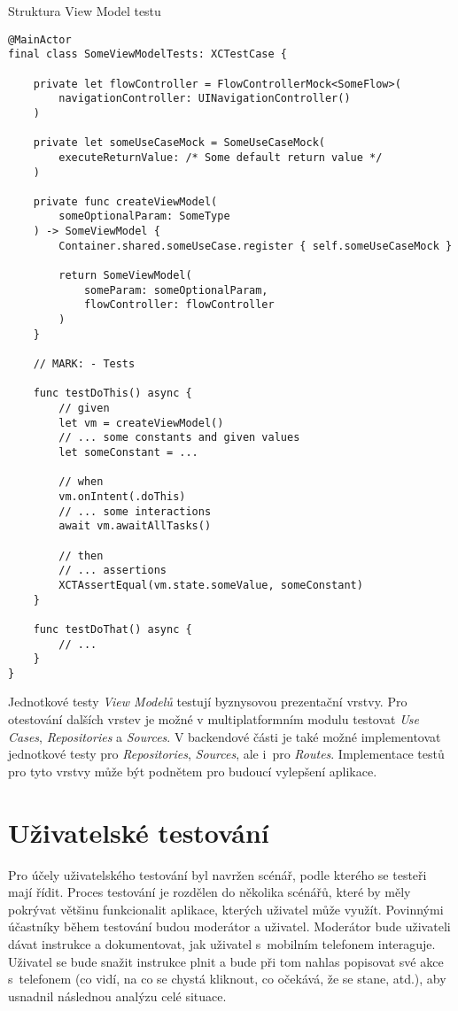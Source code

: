 \begin{listing}
\caption{Struktura View Model testu}\label{code:vm-test-sctructure}
\begin{verbatim}
@MainActor
final class SomeViewModelTests: XCTestCase {

    private let flowController = FlowControllerMock<SomeFlow>(
        navigationController: UINavigationController()
    )
    
    private let someUseCaseMock = SomeUseCaseMock(
        executeReturnValue: /* Some default return value */
    )
    
    private func createViewModel(
        someOptionalParam: SomeType
    ) -> SomeViewModel {
        Container.shared.someUseCase.register { self.someUseCaseMock }
	
        return SomeViewModel(
            someParam: someOptionalParam,
            flowController: flowController
        )
    }
    
    // MARK: - Tests
    
    func testDoThis() async {
        // given
        let vm = createViewModel()
        // ... some constants and given values
        let someConstant = ...
    	
        // when
        vm.onIntent(.doThis)
        // ... some interactions
        await vm.awaitAllTasks()
		
        // then
        // ... assertions
        XCTAssertEqual(vm.state.someValue, someConstant)
    }
    
    func testDoThat() async {
        // ...
    }
}
\end{verbatim}
\end{listing}

Jednotkové testy \emph{View Modelů} testují byznysovou prezentační vrstvy. Pro otestování dalších vrstev je možné v multiplatformním modulu testovat \emph{Use Cases}, \emph{Repositories} a \emph{Sources}. V backendové části je také možné implementovat jednotkové testy pro \emph{Repositories}, \emph{Sources}, ale i~pro \emph{Routes}. Implementace testů pro tyto vrstvy může být podnětem pro budoucí vylepšení aplikace.

\section{Uživatelské testování}

Pro účely uživatelského testování byl navržen scénář, podle kterého se testeři mají řídit. Proces testování je rozdělen do několika scénářů, které by měly pokrývat většinu funkcionalit aplikace, kterých uživatel může využít. Povinnými účastníky během testování budou moderátor a uživatel. Moderátor bude uživateli dávat instrukce a dokumentovat, jak uživatel s~mobilním telefonem interaguje. Uživatel se bude snažit instrukce plnit a bude při tom nahlas popisovat své akce s~telefonem (co vidí, na co se chystá kliknout, co očekává, že se stane, atd.), aby usnadnil následnou analýzu celé situace. 

